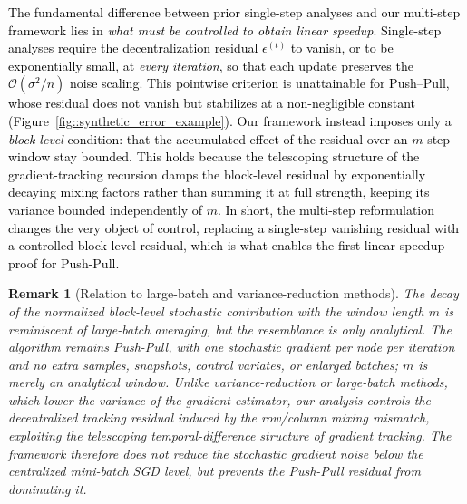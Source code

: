 \documentclass[10pt]{article}
\newtheorem{remark}{Remark}
\newcommand{\pushpull}{{\sc Push-Pull}\xspace}
\newcommand{\revision}[1]{\textcolor{black}{#1}}
\begin{document}
\revision{The fundamental difference between prior single-step analyses and 
our multi-step framework lies in \emph{what must be controlled to obtain 
linear speedup}. Single-step analyses require the decentralization 
residual \(\epsilon^{(t)}\) to vanish, or to be exponentially small, at 
\emph{every iteration}, so that each update preserves the 
\(\mathcal{O}(\sigma^2/n)\) noise scaling. This pointwise criterion is 
unattainable for Push--Pull, whose residual does not vanish but 
stabilizes at a non-negligible constant 
(Figure~\ref{fig::synthetic_error_example}). Our framework instead 
imposes only a \emph{block-level} condition: that the accumulated effect 
of the residual over an \(m\)-step window stay bounded. This holds 
because the telescoping structure of the gradient-tracking recursion 
damps the block-level residual by exponentially decaying mixing factors 
rather than summing it at full strength, keeping its variance bounded 
independently of \(m\). In short, the multi-step reformulation changes the very object of control, replacing a single-step vanishing residual with a controlled block-level residual, which is what enables the first linear-speedup proof for \pushpull. }

\begin{remark}[Relation to large-batch and variance-reduction methods]
The decay of the normalized block-level stochastic contribution with the 
window length $m$ is reminiscent of large-batch averaging, but the 
resemblance is only analytical. The algorithm remains \pushpull, with 
one stochastic gradient per node per iteration and no extra samples, 
snapshots, control variates, or enlarged batches; $m$ is merely an 
analytical window. Unlike variance-reduction or large-batch methods, 
which lower the variance of the gradient estimator, our analysis 
controls the decentralized tracking residual induced by the row/column 
mixing mismatch, exploiting the telescoping temporal-difference 
structure of gradient tracking. The framework therefore does not reduce 
the stochastic gradient noise below the centralized mini-batch SGD 
level, but prevents the \pushpull residual from dominating it.
\end{remark}

    
    
\end{document}
